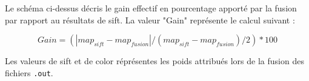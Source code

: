 \documentclass[a4paper, 11pt]{article}
\begin{document}
Le schéma ci-dessus décris le gain effectif en pourcentage apporté par la fusion par rapport au résultats de sift. La valeur "Gain" représente le calcul suivant :

\begin{equation}
  Gain = (| map_{sift} - map_{fusion} | / (map_{sift} - map_{fusion}) / 2) * 100
\end{equation}

Les valeurs de sift et de color réprésentes les poids attribués lors de la fusion des fichiers \texttt{.out}. 
\end{document}
